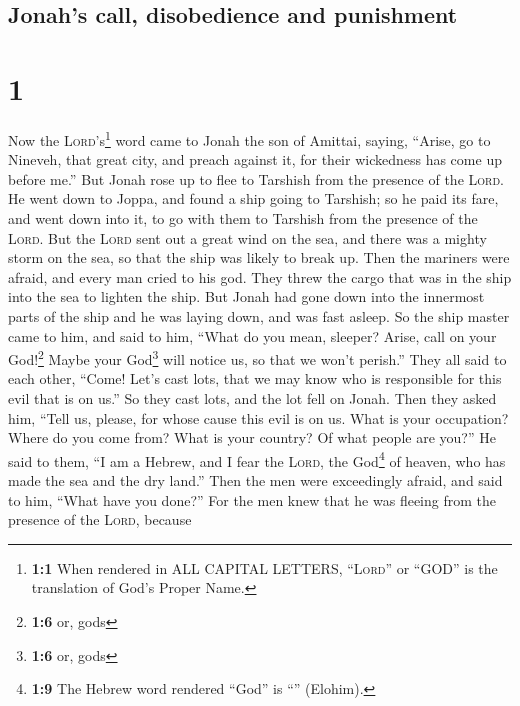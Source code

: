 \hypertarget{jonahs-call-disobedience-and-punishment}{%
\subsection{Jonah's call, disobedience and
punishment}\label{jonahs-call-disobedience-and-punishment}}

\hypertarget{section}{%
\section{1}\label{section}}

 Now the \textsc{Lord}'s\footnote{\textbf{1:1} When
  rendered in ALL CAPITAL LETTERS, ``\textsc{Lord}'' or ``GOD'' is the
  translation of God's Proper Name.} word came to Jonah the son of
Amittai, saying,  ``Arise, go to Nineveh, that great city,
and preach against it, for their wickedness has come up before me.''
 But Jonah rose up to flee to Tarshish from the presence
of the \textsc{Lord}. He went down to Joppa, and found a ship going to
Tarshish; so he paid its fare, and went down into it, to go with them to
Tarshish from the presence of the \textsc{Lord}.  But the
\textsc{Lord} sent out a great wind on the sea, and there was a mighty
storm on the sea, so that the ship was likely to break up.
 Then the mariners were afraid, and every man cried to his
god. They threw the cargo that was in the ship into the sea to lighten
the ship. But Jonah had gone down into the innermost parts of the ship
and he was laying down, and was fast asleep.  So the ship
master came to him, and said to him, ``What do you mean, sleeper? Arise,
call on your God!\footnote{\textbf{1:6} or, gods} Maybe your
God\footnote{\textbf{1:6} or, gods} will notice us, so that we won't
perish.''  They all said to each other, ``Come! Let's cast
lots, that we may know who is responsible for this evil that is on us.''
So they cast lots, and the lot fell on Jonah.  Then they
asked him, ``Tell us, please, for whose cause this evil is on us. What
is your occupation? Where do you come from? What is your country? Of
what people are you?''  He said to them, ``I am a Hebrew,
and I fear the \textsc{Lord}, the God\footnote{\textbf{1:9} The Hebrew
  word rendered ``God'' is ``'' (Elohim).} of heaven, who
has made the sea and the dry land.''  Then the men were
exceedingly afraid, and said to him, ``What have you done?'' For the men
knew that he was fleeing from the presence of the \textsc{Lord}, because

